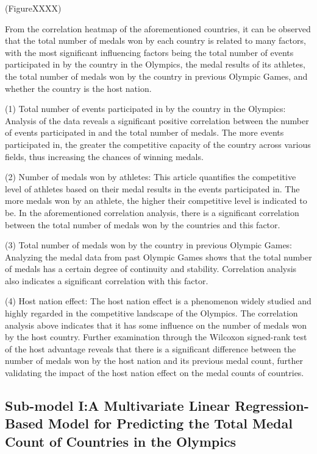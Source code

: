 \documentclass{mcmthesis}
\begin{document}
(FigureXXXX)

From the correlation heatmap of the aforementioned countries, it can be observed that the total number of medals won by each country is related to many factors, with the most significant influencing factors being the total number of events participated in by the country in the Olympics, the medal results of its athletes, the total number of medals won by the country in previous Olympic Games, and whether the country is the host nation.

(1) Total number of events participated in by the country in the Olympics: Analysis of the data reveals a significant positive correlation between the number of events participated in and the total number of medals. The more events participated in, the greater the competitive capacity of the country across various fields, thus increasing the chances of winning medals.

(2) Number of medals won by athletes: This article quantifies the competitive level of athletes based on their medal results in the events participated in. The more medals won by an athlete, the higher their competitive level is indicated to be. In the aforementioned correlation analysis, there is a significant correlation between the total number of medals won by the countries and this factor.

(3) Total number of medals won by the country in previous Olympic Games: Analyzing the medal data from past Olympic Games shows that the total number of medals has a certain degree of continuity and stability. Correlation analysis also indicates a significant correlation with this factor.

(4) Host nation effect: The host nation effect is a phenomenon widely studied and highly regarded in the competitive landscape of the Olympics. The correlation analysis above indicates that it has some influence on the number of medals won by the host country. Further examination through the Wilcoxon signed-rank test of the host advantage reveals that there is a significant difference between the number of medals won by the host nation and its previous medal count, further validating the impact of the host nation effect on the medal counts of countries.

\subsection{Sub-model I:A Multivariate Linear Regression-Based Model for Predicting the Total Medal Count of Countries in the Olympics}
\end{document}
